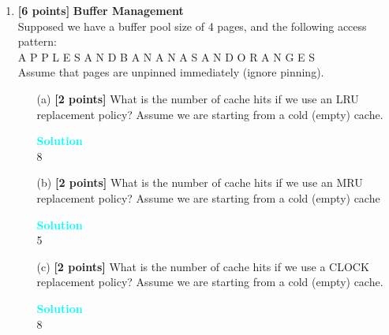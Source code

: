 \documentclass[10pt]{article}
\newenvironment{solution}
    { \begin{mdframed}[backgroundcolor=gray!10] \textcolor{cyan}{\textbf{Solution}} \\}
    {  \end{mdframed}}
\begin{document}
\begin{enumerate}
\begin{itemize}
	      \end{itemize}


	\item \textbf{[6 points]} \textbf{Buffer Management} \\


	      Supposed we have a buffer pool size of 4 pages, and the following access pattern: \\
	      A P P L E S A N D B A N A N A S A N D O R A N G E S \\
	      Assume that pages are unpinned immediately (ignore pinning).


	      \begin{itemize}
		      \item[(a)] \textbf{[2 points]} What is the number of cache hits if we
		            use an LRU replacement policy? Assume we are starting from a cold (empty) cache.
		            \begin{solution}
			            8
		            \end{solution}
		      \item[(b)] \textbf{[2 points]} What is the number of cache hits if we
		            use an MRU replacement policy? Assume we are starting from a cold (empty) cache
		            \begin{solution}
			            5
		            \end{solution}
		      \item[(c)] \textbf{[2 points]} What is the number of cache hits if we
		            use a CLOCK replacement policy? Assume we are starting from a cold (empty) cache.
		            \begin{solution}
			            8
		            \end{solution}
	      \end{itemize}
\end{enumerate}



\newpage
\end{document}
